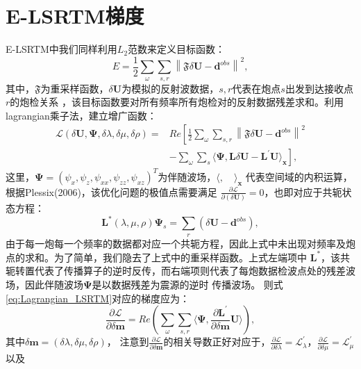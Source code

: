 \section{E-LSRTM梯度}
E-LSRTM中我们同样利用$L_2$范数来定义目标函数：
\begin{equation}
    E=\frac{1}{2}\sum_{\omega}\sum_{s,r}\left\lVert \mathfrak{F}\delta \mathbf{U}-\mathbf{d}^{obs} \right \rVert^2,
    \label{eq:misfit_LSRTM}
\end{equation}
其中，$\mathfrak{F}$为重采样函数，$\delta\mathbf{U}$为模拟的反射波数据，$s,r$代表在炮点$s$出发到达接收点$r$的炮检关系
，该目标函数要对所有频率所有炮检对的反射数据残差求和。利用lagrangian乘子法，建立增广函数：
\begin{equation}
\begin{split}
    \mathcal{L}(\delta\mathbf{U},\bm\Psi,\delta\lambda,\delta\mu,\delta\rho)=&Re\left[
	\frac{1}{2}\sum_{\omega}\sum_{s,r}\left\lVert \mathfrak{F}\delta \mathbf{U}-\mathbf{d}^{obs} \right \rVert^2 \right. \\
	&\left.-\sum_{\omega}\sum_{s}\langle\bm\Psi,\mathbf{L}\delta\mathbf{U}-\mathbf{L}^{'}\mathbf{U}\rangle_{\mathbf{x}}\right],
    \label{eq:Lagrangian_LSRTM}
\end{split}
\end{equation}
这里，$\bm\Psi=(\psi_x,\psi_z,\psi_{xx},\psi_{zz},\psi_{xz})^T$为伴随波场，$\langle,\quad\rangle_\mathbf{x}$
代表空间域的内积运算，根据Plessix(2006)\cite{plessix2006}，该优化问题的极值点需要满足
$\frac{\partial\mathcal{L}}{\partial(\delta\mathbf{U})}=0$，也即对应于共轭状态方程：
\begin{equation}
	\mathbf{L}^*(\lambda,\mu,\rho)\bm\Psi_s=\sum_{r}(\delta\mathbf{U}-\mathbf{d}^{obs}),
    \label{eq:Adjoint_LSRTM} 
\end{equation}
由于每一炮每一个频率的数据都对应一个共轭方程，因此上式中未出现对频率及炮点的求和。为了简单，我们隐去了上式中的重采样函数。上式左端项中
$\mathbf{L}^*$，该共轭转置代表了传播算子的逆时反传，而右端项则代表了每炮数据检波点处的残差波场，因此伴随波场$\bm\Psi$是以数据残差为震源的逆时
传播波场。
则式\ref{eq:Lagrangian_LSRTM}对应的梯度应为：
\begin{equation}
    \frac{\partial\mathcal{L}}{\partial \delta\mathbf{m}}=Re\left(\sum_{\omega}\sum_{s,r}
	\langle\bm\Psi,\frac{\partial \mathbf{L}^{'}}{\partial\delta\mathbf{m}}\mathbf{U}\rangle\right),
    \label{eq:Gradient_LSRTM}
\end{equation}
其中$\delta\mathbf{m}=(\delta\lambda, \delta\mu,\delta\rho)$，
注意到$\frac{\partial\mathcal{L}}{\partial \delta\mathbf{m}}$的相关导数正好对应于，$\frac{\partial\mathcal{L}}{\partial 
\delta\lambda}=\mathcal{L}^{'}_{\lambda}$，$\frac{\partial\mathcal{L}}{\partial\delta\mu}=\mathcal{L}^{'}_{\mu}$以及
